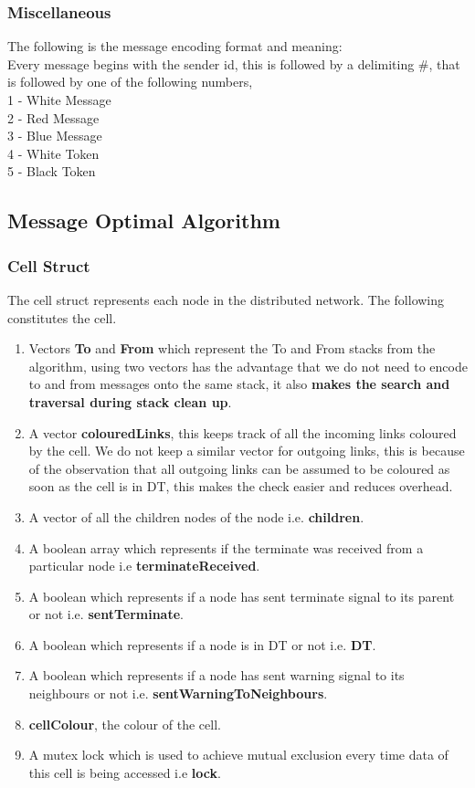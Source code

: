 \documentclass[a4paper,12pt]{report}
\begin{document}
\subsubsection{Miscellaneous}
The following is the message encoding format and meaning:\\
Every message begins with the sender id, this is followed by a delimiting \#, that is followed by one of the following numbers,\\
 1 - White Message\\
 2 - Red Message\\
 3 - Blue Message\\
 4 - White Token\\
 5 - Black Token\\
\subsection{Message Optimal Algorithm}
\subsubsection{Cell Struct}
The cell struct represents each node in the distributed network. The following constitutes the cell.
\begin{enumerate}
\item Vectors \textbf{To} and \textbf{From} which represent the To and From stacks from the algorithm, using two vectors has the advantage that we do not need to encode to and from messages onto the same stack, it also \textbf{makes the search and traversal during stack clean up}.
\item A vector \textbf{colouredLinks}, this keeps track of all the incoming links coloured by the cell. We do not keep a similar vector for outgoing links, this is because of the observation that all outgoing links can be assumed to be coloured as soon as the cell is in DT, this makes the check easier and reduces overhead.
\item A vector of all the children nodes of the node i.e. \textbf{children}.
\item A boolean array which represents if the terminate was received from a particular node i.e \textbf{terminateReceived}.
\item A boolean which represents if a node has sent terminate signal to its parent or not i.e. \textbf{sentTerminate}.
\item A boolean which represents if a node is in DT or not i.e. \textbf{DT}.
\item A boolean which represents if a node has sent warning signal to its neighbours or not i.e. \textbf{sentWarningToNeighbours}.
\item \textbf{cellColour}, the colour of the cell.
\item A mutex lock which is used to achieve mutual exclusion every time data of this cell is being accessed i.e \textbf{lock}.
\end{enumerate}
\end{document}
